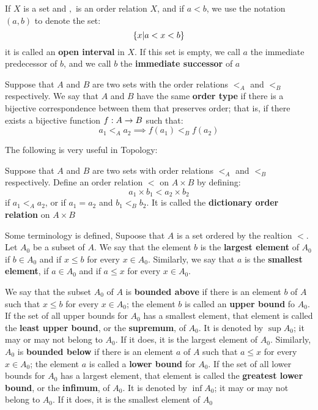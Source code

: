 \begin{define}
	If $X$ is a set and $,$ is an order relation $X$, and if $a < b$, we use the notation $(a,b)$ to denote the set:
	\[ \left\lbrace x | a < x < b \right\rbrace \]
	it is called an \textbf{open interval } in $X$. If this set is empty, we call $a$ the immediate predecessor of $b$, and we call $b$ the \textbf{immediate successor} of $a$
\end{define}

\begin{define}
	Suppose that $A$ and $B$ are two sets with the order relations $ <_A $ and $ <_B $ respectively. We say that $A$ and $B$ have the same \textbf{order type} if there is a bijective correspondence between them that preserves order; that is, if there exists a bijective function $f : A \rightarrow B$ such that:
	\[ a_1 <_A a_2 \implies f(a_1) <_B f(a_2) \]
	
\end{define}

The following is very useful in Topology:

\begin{define}
	Suppose that $A$ and $B$ are two sets with order relations $ <_A $ and $ < _B $ respectively. Define an order relation $ <$ on $A \times B$ by defining:
	\[ a_1 \times b_1  < a_2 \times b_2 \]
	if $a_1 <_A a_2$, or if $a_1 = a_2 $ and $ b_1 <_B b_2$. It is called the \textbf{dictionary order relation} on $ A \times B$
\end{define}

Some terminology is defined, Supoose that $A$ is a set ordered by the realtion $<$. Let $A_0$ be a subset of $A$. We say that the element $b$ is the \textbf{largest element} of $A_0$ if $b \in A_0$ and if $ x \leq b$ for every $x \in A_0$. Similarly, we say that $a$ is the \textbf{smallest element}, if $a \in A_0$ and if $a \leq x$ for every $x \in A_0$.

We say that the subset $A_0$ of $A$ is \textbf{bounded above} if there is an element $b$ of $A$ such that $x \leq b$ for every $ x \in A_0$; the element $b$ is called an \textbf{upper bound } fo $A_0$. If the set of all upper bounds for $A_0$ has a smallest element, that element is called the \textbf{least upper bound}, or the \textbf{supremum}, of $A_0$. It is denoted by $ \sup A_0$; it may or may not belong to $A_0$. If it does, it is the largest element of $A_0$.
	Similarly, $A_0$ is \textbf{bounded below} if there is an element $a$ of $A$ such that $ a \leq x$ for every $x \in A_0 $; the element $a$ is called a \textbf{lower bound} for $A_0$. If the set of all lower bounds for $A_0$ has a largest element, that element is called the \textbf{greatest lower bound}, or the \textbf{infimum}, of $A_0$. It is denoted by $ \inf A_0$; it may or may not belong to $A_0$. If it does, it is the smallest element of $A_0$
	
